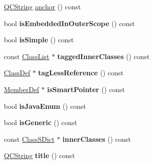 \begin{DoxyCompactItemize}
\item 
\hyperlink{class_q_c_string}{Q\-C\-String} \hyperlink{class_class_def_acd17ae1d9600f864b1beb85dfb99a4f4}{anchor} () const 
\item 
\hypertarget{class_class_def_ac676e6830cd4943345b79f6e907198c3}{bool {\bfseries is\-Embedded\-In\-Outer\-Scope} () const }\label{class_class_def_ac676e6830cd4943345b79f6e907198c3}

\item 
\hypertarget{class_class_def_a1173815e97366bb5478b113f3bdb96f4}{bool {\bfseries is\-Simple} () const }\label{class_class_def_a1173815e97366bb5478b113f3bdb96f4}

\item 
\hypertarget{class_class_def_a30d0dd8dc490c9107c8b7b4182b56599}{const \hyperlink{class_class_list}{Class\-List} $\ast$ {\bfseries tagged\-Inner\-Classes} () const }\label{class_class_def_a30d0dd8dc490c9107c8b7b4182b56599}

\item 
\hypertarget{class_class_def_a64b5b53cc3bed64b6e71667b92184f0a}{\hyperlink{class_class_def}{Class\-Def} $\ast$ {\bfseries tag\-Less\-Reference} () const }\label{class_class_def_a64b5b53cc3bed64b6e71667b92184f0a}

\item 
\hypertarget{class_class_def_ad68ef9c48463aee9303ebf4027a45504}{\hyperlink{class_member_def}{Member\-Def} $\ast$ {\bfseries is\-Smart\-Pointer} () const }\label{class_class_def_ad68ef9c48463aee9303ebf4027a45504}

\item 
\hypertarget{class_class_def_a6172a152d379e7b464530108fa21abb1}{bool {\bfseries is\-Java\-Enum} () const }\label{class_class_def_a6172a152d379e7b464530108fa21abb1}

\item 
\hypertarget{class_class_def_a23dc989285849b8207359f6d9e0a0d18}{bool {\bfseries is\-Generic} () const }\label{class_class_def_a23dc989285849b8207359f6d9e0a0d18}

\item 
\hypertarget{class_class_def_ab3d57806b719dbd83a0c54e149142f01}{const \hyperlink{class_class_s_dict}{Class\-S\-Dict} $\ast$ {\bfseries inner\-Classes} () const }\label{class_class_def_ab3d57806b719dbd83a0c54e149142f01}

\item 
\hypertarget{class_class_def_adf5241b59706e696c508de8baa4c2f97}{\hyperlink{class_q_c_string}{Q\-C\-String} {\bfseries title} () const }\label{class_class_def_adf5241b59706e696c508de8baa4c2f97}


\end{DoxyCompactItemize}
